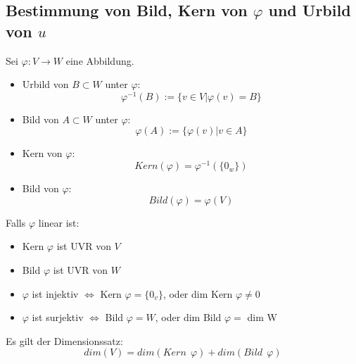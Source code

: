 \documentclass{scrartcl}
\begin{document}
\subsection{Bestimmung von Bild, Kern von $\varphi$ und Urbild von $u$}

\begin{Def}
Sei $\varphi : V \rightarrow W $ eine Abbildung.
\begin{itemize}
\item Urbild von $B \subset W $ unter $\varphi$:
\[\varphi^{-1}(B) :=  \{v \in V | \varphi(v) = B\}\]
\item Bild von $A \subset W $ unter $\varphi$:
\[\varphi(A) :=  \{\varphi(v) | v \in A\}\]
\item Kern von $\varphi$:
\[Kern(\varphi) = \varphi^{-1}(\{0_w\})\]
\item Bild von $\varphi$:
\[Bild(\varphi) = \varphi(V)\]
\end{itemize}
Falls $\varphi$ linear ist:

\begin{itemize}
\item Kern $\varphi$ ist UVR von $V$
\item Bild $\varphi$ ist UVR von $W$
\item $\varphi$ ist injektiv $\Leftrightarrow$ Kern $\varphi = \{0_v\}$, oder dim Kern $\varphi \neq 0$ 
\item $\varphi$ ist surjektiv $\Leftrightarrow$ Bild $\varphi = W$, oder dim Bild $\varphi =$ dim W 
\end{itemize}

Es gilt der Dimensionssatz:
\[dim(V) = dim(Kern~~\varphi) + dim(Bild~~\varphi)\]

\end{Def}
\end{document}
